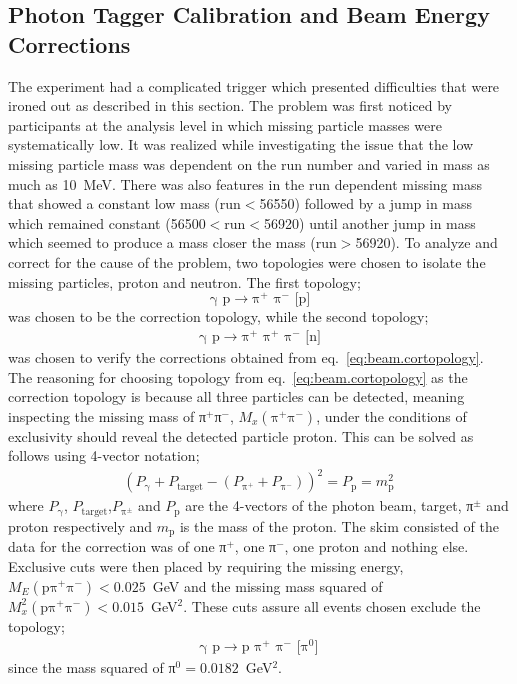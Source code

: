 \subsection{\label{sec:calib.tag}Photon Tagger Calibration and Beam Energy Corrections}

The  experiment had a complicated trigger which presented difficulties that were ironed out as described in this section. The problem was first noticed by  participants at the analysis level in which missing particle masses were systematically low. It was realized while investigating the issue that the low missing particle mass was dependent on the run number and varied in mass as much as 10~MeV. There was also features in the run dependent missing mass that showed a constant low mass (run$<$56550) followed by a jump in mass which remained constant (56500$<$run$<$56920) until another jump in mass which seemed to produce a mass closer the  mass (run$>$56920). To analyze and correct for the cause of the problem, two topologies were chosen to isolate the missing particles, proton and neutron. The first topology;
\begin{equation}
    \text{γ p$\rightarrow$π$^+$ π$^-$ [p]}
    \label{eq:beam.cortopology}
\end{equation}
was chosen to be the correction topology, while the second topology;
\begin{align}
    \text{γ p$\rightarrow$π$^+$ π$^+$ π$^-$ [n]}
    \label{eq:beam.checktopology}
\end{align}
was chosen to verify the corrections obtained from eq.~\ref{eq:beam.cortopology}. The reasoning for choosing topology from eq.~\ref{eq:beam.cortopology} as the correction topology is because all three particles can be detected, meaning inspecting the missing mass of π$^+$π$^-$, $M_x(\text{π$^+$π$^-$})$, under the conditions of exclusivity should reveal the detected particle proton. This can be solved as follows using 4-vector notation;
\begin{align}
    (P_\text{γ} + P_\mathrm{target} - (P_\text{π$^+$} + P_\text{π$^-$}))^2 = P_\text{p} = m_\text{p}^2 \,
\end{align}
where $P_\text{γ}$, $P_\mathrm{target}$,$P_\text{π$^\pm$}$ and $P_\text{p}$ are the 4-vectors of the photon beam, target, π$^\pm$ and proton respectively and $m_\text{p}$ is the mass of the proton.
The skim consisted of the data for the correction was of one   π$^+$, one   π$^-$, one   proton and nothing else. Exclusive cuts were then placed by requiring the missing energy, $M_E(\text{pπ$^+$π$^-$}) < 0.025$~GeV and the missing mass squared of $M_x^2(\text{pπ$^+$π$^-$}) < 0.015$~GeV$^2$. These cuts assure all events chosen exclude the topology;
\begin{align}
    \text{γ p}\rightarrow\text{p π$^+$ π$^-$ [π$^0$]} \nonumber \,
\end{align}
since the mass squared of π$^0 = 0.0182$~GeV$^2$.

